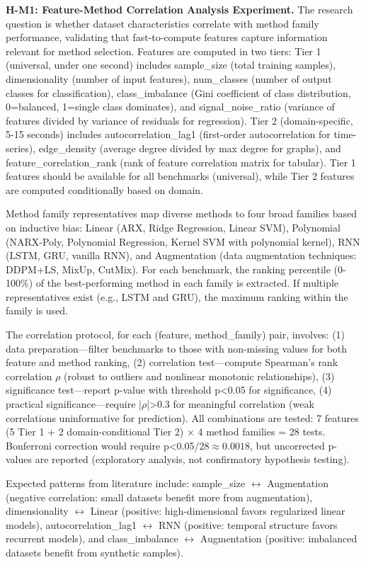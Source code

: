 \textbf{H-M1: Feature-Method Correlation Analysis Experiment.} The research question is whether dataset characteristics correlate with method family performance, validating that fast-to-compute features capture information relevant for method selection. Features are computed in two tiers: Tier 1 (universal, under one second) includes sample\_size (total training samples), dimensionality (number of input features), num\_classes (number of output classes for classification), class\_imbalance (Gini coefficient of class distribution, 0=balanced, 1=single class dominates), and signal\_noise\_ratio (variance of features divided by variance of residuals for regression). Tier 2 (domain-specific, 5-15 seconds) includes autocorrelation\_lag1 (first-order autocorrelation for time-series), edge\_density (average degree divided by max degree for graphs), and feature\_correlation\_rank (rank of feature correlation matrix for tabular). Tier 1 features should be available for all benchmarks (universal), while Tier 2 features are computed conditionally based on domain.

Method family representatives map diverse methods to four broad families based on inductive bias: Linear (ARX, Ridge Regression, Linear SVM), Polynomial (NARX-Poly, Polynomial Regression, Kernel SVM with polynomial kernel), RNN (LSTM, GRU, vanilla RNN), and Augmentation (data augmentation techniques: DDPM+LS, MixUp, CutMix). For each benchmark, the ranking percentile (0-100\%) of the best-performing method in each family is extracted. If multiple representatives exist (e.g., LSTM and GRU), the maximum ranking within the family is used.

The correlation protocol, for each (feature, method\_family) pair, involves: (1) data preparation---filter benchmarks to those with non-missing values for both feature and method ranking, (2) correlation test---compute Spearman's rank correlation $\rho$ (robust to outliers and nonlinear monotonic relationships), (3) significance test---report p-value with threshold p<0.05 for significance, (4) practical significance---require |$\rho$|>0.3 for meaningful correlation (weak correlations uninformative for prediction). All combinations are tested: 7 features (5 Tier 1 + 2 domain-conditional Tier 2) $\times$ 4 method families = 28 tests. Bonferroni correction would require p<0.05/$28\approx 0.0018$, but uncorrected p-values are reported (exploratory analysis, not confirmatory hypothesis testing).

Expected patterns from literature include: sample\_size $\leftrightarrow$ Augmentation (negative correlation: small datasets benefit more from augmentation), dimensionality $\leftrightarrow$ Linear (positive: high-dimensional favors regularized linear models), autocorrelation\_lag1 $\leftrightarrow$ RNN (positive: temporal structure favors recurrent models), and class\_imbalance $\leftrightarrow$ Augmentation (positive: imbalanced datasets benefit from synthetic samples).

